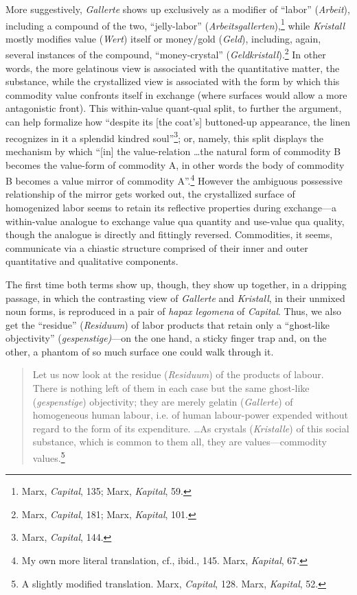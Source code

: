 \documentclass[12pt]{article}
\begin{document}
More suggestively, \textit{Gallerte} shows up exclusively as a modifier of ``labor'' (\textit{Arbeit}), including a compound of the two, ``jelly-labor'' (\textit{Arbeitsgallerten}),\footnote{Marx, \textit{Capital}, 135; Marx, \textit{Kapital}, 59.} while \textit{Kristall} mostly modifies value (\textit{Wert}) itself or money/gold (\textit{Geld}), including, again, several instances of the compound, ``money-crystal'' (\textit{Geldkristall}).\footnote{Marx, \textit{Capital}, 181; Marx, \textit{Kapital}, 101.} In other words, the more gelatinous view is associated with the quantitative matter, the substance, while the crystallized view is associated with the form by which this commodity value confronts itself in exchange (where surfaces would allow a more antagonistic front). This within-value quant-qual split, to further the argument, can help formalize how ``despite its [the coat's] buttoned-up appearance, the linen recognizes in it a splendid kindred soul''\footnote{Marx, \textit{Capital}, 144.}; or, namely, this split displays the mechanism by which ``[in] the value-relation \dots  the natural form of commodity B becomes the value-form of commodity A, in other words the body of commodity B becomes a value mirror of commodity A''.\footnote{My own more literal translation, cf., ibid., 145. Marx, \textit{Kapital}, 67.} However the ambiguous possessive relationship of the mirror gets worked out, the crystallized surface of homogenized labor seems to retain its reflective properties during exchange---a within-value analogue to exchange value qua quantity and use-value qua quality, though the analogue is directly and fittingly reversed. Commodities, it seems, communicate via a chiastic structure comprised of their inner and outer quantitative and qualitative components.  

The first time both terms show up, though, they show up together, in a dripping passage, in which the contrasting view of \textit{Gallerte} and \textit{Kristall}, in their unmixed noun forms, is reproduced in a pair of \textit{hapax legomena} of \textit{Capital}. Thus, we also get the ``residue'' (\textit{Residuum}) of labor products that retain only a ``ghost-like objectivity'' (\textit{gespenstige)}---on the one hand, a sticky finger trap and, on the other, a phantom of so much surface one could walk through it.   

\begin{quote}
\begin{singlespace}
Let us now look at the residue (\textit{Residuum}) of the products of labour. There is nothing left of them in each case but the same ghost-like (\textit{gespenstige}) objectivity; they are merely gelatin (\textit{Gallerte}) of homogeneous human labour, i.e. of human labour-power expended without regard to the form of its expenditure. \dots  As crystals (\textit{Kristalle}) of this social substance, which is common to them all, they are values---commodity values.\footnote{A slightly modified translation. Marx, \textit{Capital}, 128. Marx, \textit{Kapital}, 52.}
\end{singlespace}
\end{quote}
\end{document}
